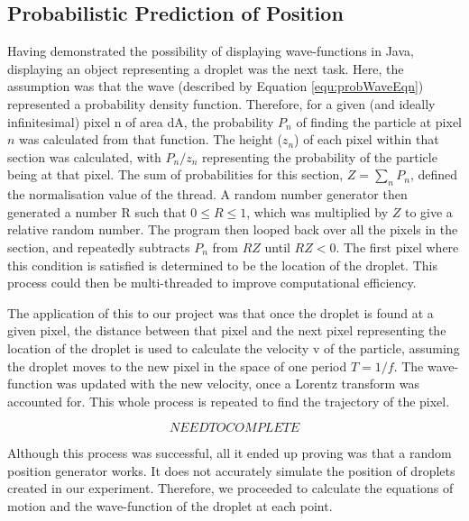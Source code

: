 \subsection{Probabilistic Prediction of Position}
Having demonstrated the possibility of displaying wave-functions in Java, displaying an object representing a droplet was the next task. Here, the assumption was that the wave (described by Equation \ref{equ:probWaveEqn}) represented a probability density function. Therefore, for a given (and ideally infinitesimal) pixel n of area dA, the probability $P_n$ of finding the particle at pixel $n$ was calculated from that function. The height ($z_n$) of each pixel within that section was calculated, with ${P_n}/{z_n}$ representing the probability of the particle being at that pixel. The sum of probabilities for this section, $Z=\sum_n{P_n}$, defined the normalisation value of the thread. A random number generator then generated a number R such that $0\leq R \leq 1$, which was multiplied by $Z$ to give a relative random number. The program then looped back over all the pixels in the section, and repeatedly subtracts $P_n$ from $RZ$ until $RZ<0$. The first pixel where this condition is satisfied is determined to be the location of the droplet. This process could then be multi-threaded to improve computational efficiency.

The application of this to our project was that once the droplet is found at a given pixel, the distance between that pixel and the next pixel representing the location of the droplet is used to calculate the velocity v of the particle, assuming the droplet moves to the new pixel in the space of one period $T=1/f$. The wave-function was updated with the new velocity, once a Lorentz transform was accounted for. This whole process is repeated to find the trajectory of the pixel.

\begin{equation}
    NEED TO COMPLETE
    \label{equ:probWaveEqn}
\end{equation}

Although this process was successful, all it ended up proving was that a random position generator works. It does not accurately simulate the position of droplets created in our experiment. Therefore, we proceeded to calculate the equations of motion and the wave-function of the droplet at each point.